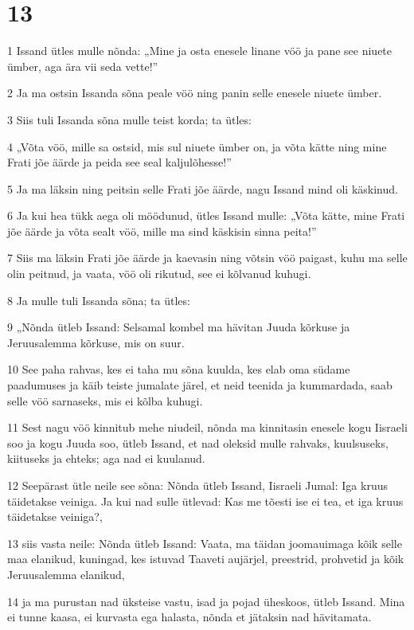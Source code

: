 \chapter{13}

\par 1 Issand ütles mulle nõnda: „Mine ja osta enesele linane vöö ja pane see niuete ümber, aga ära vii seda vette!”
\par 2 Ja ma ostsin Issanda sõna peale vöö ning panin selle enesele niuete ümber.
\par 3 Siis tuli Issanda sõna mulle teist korda; ta ütles:
\par 4 „Võta vöö, mille sa ostsid, mis sul niuete ümber on, ja võta kätte ning mine Frati jõe äärde ja peida see seal kaljulõhesse!”
\par 5 Ja ma läksin ning peitsin selle Frati jõe äärde, nagu Issand mind oli käskinud.
\par 6 Ja kui hea tükk aega oli möödunud, ütles Issand mulle: „Võta kätte, mine Frati jõe äärde ja võta sealt vöö, mille ma sind käskisin sinna peita!”
\par 7 Siis ma läksin Frati jõe äärde ja kaevasin ning võtsin vöö paigast, kuhu ma selle olin peitnud, ja vaata, vöö oli rikutud, see ei kõlvanud kuhugi.
\par 8 Ja mulle tuli Issanda sõna; ta ütles:
\par 9 „Nõnda ütleb Issand: Selsamal kombel ma hävitan Juuda kõrkuse ja Jeruusalemma kõrkuse, mis on suur.
\par 10 See paha rahvas, kes ei taha mu sõna kuulda, kes elab oma südame paadumuses ja käib teiste jumalate järel, et neid teenida ja kummardada, saab selle vöö sarnaseks, mis ei kõlba kuhugi.
\par 11 Sest nagu vöö kinnitub mehe niudeil, nõnda ma kinnitasin enesele kogu Iisraeli soo ja kogu Juuda soo, ütleb Issand, et nad oleksid mulle rahvaks, kuulsuseks, kiituseks ja ehteks; aga nad ei kuulanud.
\par 12 Seepärast ütle neile see sõna: Nõnda ütleb Issand, Iisraeli Jumal: Iga kruus täidetakse veiniga. Ja kui nad sulle ütlevad: Kas me tõesti ise ei tea, et iga kruus täidetakse veiniga?,
\par 13 siis vasta neile: Nõnda ütleb Issand: Vaata, ma täidan joomauimaga kõik selle maa elanikud, kuningad, kes istuvad Taaveti aujärjel, preestrid, prohvetid ja kõik Jeruusalemma elanikud,
\par 14 ja ma purustan nad üksteise vastu, isad ja pojad üheskoos, ütleb Issand. Mina ei tunne kaasa, ei kurvasta ega halasta, nõnda et jätaksin nad hävitamata.
